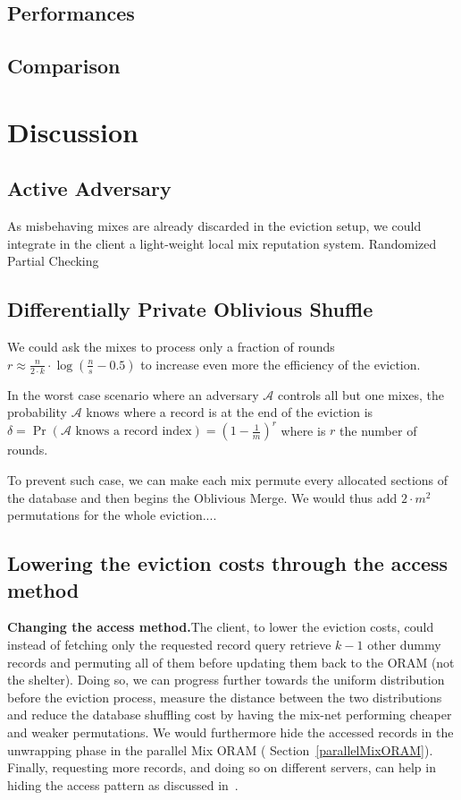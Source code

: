 \documentclass{llncs}
\begin{document}
\subsection{Performances}\label{Performance}
\subsection{Comparison}\label{Comparison}

\section{Discussion}\label{Discussion}

\subsection{Active Adversary}\label{Active Adversary}
As misbehaving mixes are already discarded in the eviction setup, we could integrate in the client a light-weight local mix reputation system.
Randomized Partial Checking


\subsection{Differentially Private Oblivious Shuffle}\label{DPOS}
We could ask the mixes to process only a fraction of rounds $r \approx \frac{n}{2\cdot k }  \cdot \log \left (\frac{n}{s}-0.5 \right)$ to increase even more the efficiency of the eviction.

In the worst case scenario where an adversary $\mathcal{A}$ controls all but one mixes, the probability  $\mathcal{A}$ knows where a record is at the end of the eviction is $\delta= \Pr \left ( \mathcal{A} \text{ knows a record index}\right ) = \left ( 1 - \frac{1}{m} \right )^r$ where is $r$ the number of rounds.

To prevent such case, we can make each mix permute every allocated sections of the database and then begins the Oblivious Merge. We would thus add $2 \cdot m^2$ permutations for the whole eviction....

\subsection{Lowering the eviction costs through the access method}\label{AccessMethod}

\noindent\textbf{Changing the access method.}The client, to lower the eviction costs, could instead of fetching only the requested record query retrieve $k-1$ other dummy records and permuting all of them before updating them back to the ORAM (not the shelter).
Doing so, we can progress further towards the uniform distribution before the eviction process, measure the distance between the two distributions and reduce the database shuffling cost by having the mix-net performing cheaper and weaker permutations. We would furthermore hide the accessed records in the unwrapping phase in the parallel Mix ORAM ( Section~\ref{parallelMixORAM}). Finally, requesting more records, and doing so on different servers, can help in hiding the access pattern as discussed in~\cite{toledo2016lower}.\\
\end{document}
